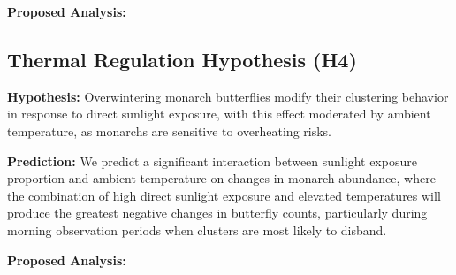 \textbf{Proposed Analysis:}

\subsection{Thermal Regulation Hypothesis (H4)}

\textbf{Hypothesis:} Overwintering monarch butterflies modify their clustering behavior in response to direct sunlight exposure, with this effect moderated by ambient temperature, as monarchs are sensitive to overheating risks.

\textbf{Prediction:} We predict a significant interaction between sunlight exposure proportion and ambient temperature on changes in monarch abundance, where the combination of high direct sunlight exposure and elevated temperatures will produce the greatest negative changes in butterfly counts, particularly during morning observation periods when clusters are most likely to disband.

\textbf{Proposed Analysis:}
